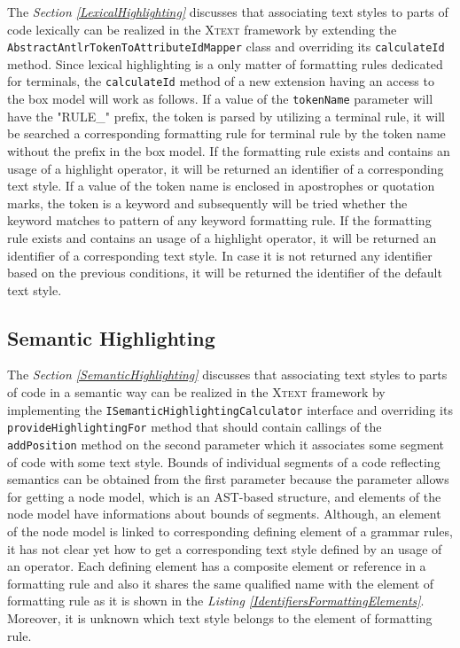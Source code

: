 \documentclass[12pt,notitlepage,a4paper]{report}
\begin{document}
The \textit{Section \ref{LexicalHighlighting}} discusses that associating text styles to parts of code lexically can be realized in the \textsc{Xtext} framework by extending the \texttt{AbstractAntlrTokenToAttributeIdMapper} class and overriding its \texttt{calculateId} method. Since lexical highlighting is a only matter of formatting rules dedicated for terminals, the \texttt{calculateId} method of a new extension having an access to the box model will work as follows. If a value of the \texttt{tokenName} parameter will have the "RULE\_" prefix, the token is parsed  by utilizing a terminal rule, it will be searched a corresponding formatting rule for terminal rule by the token name without the prefix in the box model. If the formatting rule exists and contains an usage of a highlight operator, it will be returned an identifier of a corresponding text style. If a value of the token name is enclosed in apostrophes or quotation marks, the token is a keyword and subsequently will be tried whether the keyword matches to pattern of any keyword formatting rule. If the formatting rule exists and contains an usage of a highlight operator, it will be returned an identifier of a corresponding text style. In case it is not returned any identifier based  on the previous conditions, it will be returned the identifier of the default text style.

\subsection{Semantic Highlighting}

The \textit{Section \ref{SemanticHighlighting}} discusses that associating text styles to parts of code in a semantic way can be realized in the \textsc{Xtext} framework by implementing the \texttt{ISemanticHighlightingCalculator} interface and overriding its \texttt{provideHighlightingFor} method that should contain callings of the \texttt{addPosition} method on the second parameter which it associates some segment of code with some text style. Bounds of individual segments of a code reflecting semantics can be obtained from the first parameter because the parameter allows for getting a node model, which is an AST-based structure, and elements of the node model have informations about bounds of segments. Although, an element of the node model is linked to corresponding defining element of a grammar rules, it has not clear yet how to get a corresponding text style defined by an usage of an operator. Each defining element has a composite element or reference in a formatting rule and also it shares the same qualified name with the element of formatting rule as it is shown in the \textit{Listing \ref{IdentifiersFormattingElements}}. Moreover, it is unknown which text style belongs to the element of formatting rule. 
\end{document}

